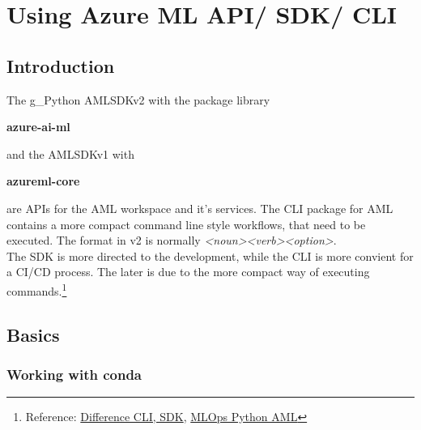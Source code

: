 \section{Using Azure ML API/ SDK/ CLI}
\subsection{Introduction}
The \gls{g_Python} \gls{AMLSDKv2} with the package library
\begin{center}
	\textbf{azure-ai-ml}
\end{center}
and the \gls{AMLSDKv1} with 
\begin{center}
	\textbf{azureml-core}
\end{center}
are \gls{API}s for the \gls{AML} workspace and it's services. The \gls{CLI} package for \gls{AML} contains a more compact command line style workflows, that need to be executed. The format in v2 is normally \textit{<noun><verb><option>}.\\

The \gls{SDK} is more directed to the development, while the \gls{CLI} is more convient for a \gls{CI}/\gls{CD} process. The later is due to the more compact way of executing commands.\footnote{Reference: \href{https://learn.microsoft.com/en-us/answers/questions/1395777/what-is-the-difference-between-azure-ail-ml-and-az}{Difference CLI, SDK}, \href{https://github.com/microsoft/MLOps}{MLOps Python AML}
}
\subsection{Basics}

\subsubsection{Working with conda}
